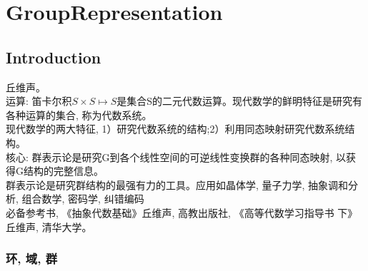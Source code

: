 \documentclass[UTF8]{../09-Mathematics}
\begin{document}
\section{GroupRepresentation}

\subsection{Introduction}
丘维声。\\
运算: 笛卡尔积$S \times S \mapsto S$是集合S的二元代数运算。现代数学的鲜明特征是研究有各种运算的集合, 称为代数系统。\\
现代数学的两大特征, 1）研究代数系统的结构;2）利用同态映射研究代数系统结构。\\
核心: 群表示论是研究G到各个线性空间的可逆线性变换群的各种同态映射, 以获得G结构的完整信息。\\
群表示论是研究群结构的最强有力的工具。应用如晶体学, 量子力学, 抽象调和分析, 组合数学, 密码学, 纠错编码\\
必备参考书, 《抽象代数基础》丘维声, 高教出版社, 《高等代数学习指导书 下》丘维声, 清华大学。

\subsubsection{环, 域, 群}
\end{document}
